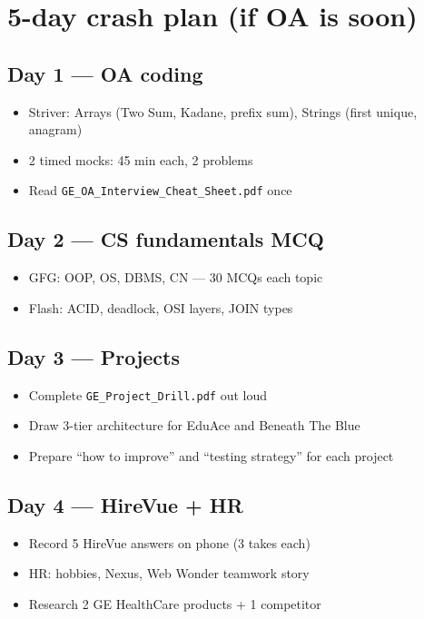 \documentclass[11pt,a4paper]{article}
\begin{document}
\section{5-day crash plan (if OA is soon)}
\subsection{Day 1 --- OA coding}
\begin{itemize}
  \item Striver: Arrays (Two Sum, Kadane, prefix sum), Strings (first unique, anagram)
  \item 2 timed mocks: 45 min each, 2 problems
  \item Read \texttt{GE\_OA\_Interview\_Cheat\_Sheet.pdf} once
\end{itemize}

\subsection{Day 2 --- CS fundamentals MCQ}
\begin{itemize}
  \item GFG: OOP, OS, DBMS, CN --- 30 MCQs each topic
  \item Flash: ACID, deadlock, OSI layers, JOIN types
\end{itemize}

\subsection{Day 3 --- Projects}
\begin{itemize}
  \item Complete \texttt{GE\_Project\_Drill.pdf} out loud
  \item Draw 3-tier architecture for EduAce and Beneath The Blue
  \item Prepare ``how to improve'' and ``testing strategy'' for each project
\end{itemize}

\subsection{Day 4 --- HireVue + HR}
\begin{itemize}
  \item Record 5 HireVue answers on phone (3 takes each)
  \item HR: hobbies, Nexus, Web Wonder teamwork story
  \item Research 2 GE HealthCare products + 1 competitor
\end{itemize}
\end{document}
